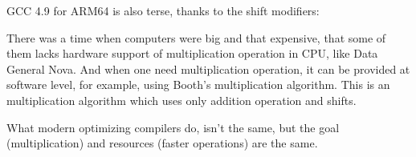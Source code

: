 





GCC 4.9 for ARM64 is also terse, thanks to the shift modifiers:




There was a time when computers were big and that expensive, that some of them lacks hardware support of multiplication
operation in \ac{CPU}, like Data General Nova.
And when one need multiplication operation, it can be provided at software level, for example, using Booth's multiplication
algorithm.
This is an multiplication algorithm which uses only addition operation and shifts.

What modern optimizing compilers do, isn't the same,
but the goal (multiplication) and resources (faster operations) are the same.


